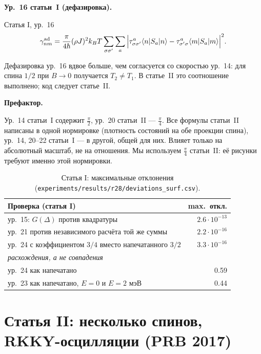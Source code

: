 \textbf{Ур.~16 статьи~I (дефазировка).}
\begin{paperbox}{Статья I, ур.~16}
\[
\gamma^{\rm ad}_{nm}=\frac{\pi}{4\hbar}(\rho J)^2k_BT\sum_{\sigma\sigma'}\sum_{a}
\Big|\tau^a_{\sigma\sigma'}\langle n|S_a|n\rangle-\tau^a_{\sigma'\sigma}\langle m|S_a|m\rangle\Big|^2 .
\]
\end{paperbox}
\begin{cmpbox}
Дефазировка ур.~16 вдвое больше, чем согласуется со скоростью ур.~14: для
спина $1/2$ при $B\to0$ получается $T_2\ne T_1$. В статье~II это соотношение
выполнено; код следует статье~II.
\end{cmpbox}

\textbf{Префактор.}
\begin{cmpbox}
Ур.~14 статьи~I содержит $\tfrac\pi2$, ур.~20 статьи~II --- $\tfrac\pi4$. Все формулы статьи~II
написаны в одной нормировке (плотность состояний на обе проекции спина),
ур.~14, 20--22 статьи~I --- в другой, общей для них. Влияет только на абсолютный
масштаб, не на отношения. Мы используем $\tfrac\pi4$ статьи~II: её рисунки требуют
именно этой нормировки.
\end{cmpbox}

\begin{table}[htbp]\centering\small
\begin{tabular}{lr}
\toprule
Проверка (статья I) & max.\ откл. \\
\midrule
ур.~15: $G(\Delta)$ против квадратуры & $2.6\cdot 10^{-13}$ \\
ур.~21 против независимого расчёта той же суммы & $2.2\cdot 10^{-16}$ \\
ур.~24 с коэффициентом $3/4$ вместо напечатанного $3/2$ & $3.3\cdot 10^{-16}$ \\
\midrule
\multicolumn{2}{l}{\emph{расхождения, а не совпадения}} \\
ур.~24 как напечатано & 0.59 \\
ур.~23 как напечатано, $E=0$ и $E=2$ мэВ & 0.44 \\
\bottomrule
\end{tabular}
\caption{Статья I: максимальные отклонения
(\texttt{experiments/results/r28/deviations\_surf.csv}).}
\label{tab:kondo_ss}\end{table}

\section{Статья II: несколько спинов, RKKY-осцилляции (PRB 2017)}
\label{sec:kondo_prb}

